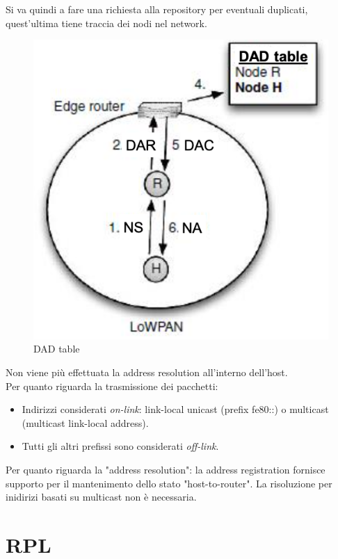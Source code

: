 \documentclass{article}
\begin{document}
Si va quindi a fare una richiesta alla repository per eventuali duplicati, quest'ultima tiene traccia dei nodi nel network. 
\begin{figure}[H]
\centering
\includegraphics[scale=0.7]{figures/dad table.PNG}
\caption{DAD table}
\end{figure}
Non viene più effettuata la address resolution all'interno dell'host. \\ Per quanto riguarda la trasmissione dei pacchetti:
\begin{itemize}
    \item Indirizzi considerati \textit{on-link}: link-local unicast (prefix fe80::) o multicast (multicast link-local address).
    \item Tutti gli altri prefissi sono considerati \textit{off-link}.
\end{itemize}
Per quanto riguarda la "address resolution": la address registration fornisce supporto per il mantenimento dello stato "host-to-router". La risoluzione per inidirizi basati su multicast non è necessaria.
\newpage

\section{RPL}
\end{document}
